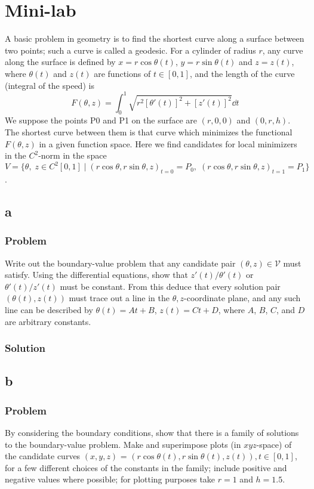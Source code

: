 \documentclass[12pt,twoside]{article}
\begin{document}
\section{Mini-lab}
A basic problem in geometry is to find the shortest curve along a surface
between two points; such a curve is called a geodesic. For a cylinder of radius
$r$, any curve along the surface is defined by $x = r\cos\theta(t)$, $y =
r\sin\theta(t)$ and $z = z(t)$, where $\theta(t)$ and $z(t)$ are functions of $t
\in [0,1]$, and the length of the curve (integral of the speed) is
\begin{equation}
  \label{eq:minilab-curve-length}
  F(\theta,z) = \int_0^1\sqrt{r^2{[\theta'(t)]}^2 + {[z'(t)]}^2}\dd{t}
\end{equation}
We suppose the points P0 and P1 on the surface are $(r,0,0)$ and $(0,r,h)$. The
shortest curve between them is that curve which minimizes the functional
$F(\theta,z)$ in a given function space. Here we find candidates for local
minimizers in the $C^2$-norm in the space $V=\{\theta,\;z\in
C^2[0,1]\;|\;{(r\cos\theta,r\sin\theta,z)}_{t=0}=P_0,
\;{(r\cos\theta,r\sin\theta,z)}_{t=1}=P_1\}$.

\subsection{a}
\subsubsection*{Problem}
Write out the boundary-value problem that any candidate pair
$(\theta,z)\in\mathcal{V}$ must satisfy. Using the differential equations, show
that $z'(t)/\theta'(t)$ or $\theta'(t)/z'(t)$ must be constant. From this deduce
that every solution pair $(\theta(t),z(t))$ must trace out a line in the
$\theta,z$-coordinate plane, and any such line can be described by $\theta(t) =
At + B$, $z(t) = Ct + D$, where $A$, $B$, $C$, and $D$ are arbitrary constants.
\subsubsection*{Solution}
\todo{}

\subsection{b}
\subsubsection*{Problem}
By considering the boundary conditions, show that there is a family of solutions
to the boundary-value problem. Make and superimpose plots (in $xyz$-space) of
the candidate curves $(x,y,z)$ = $(r\cos\theta(t),r\sin\theta(t),z(t)), t\in[0,1]$,
for a few different choices of the constants in the family; include positive and
negative values where possible; for plotting purposes take $r = 1$ and $h =
1.5$.
\end{document}
